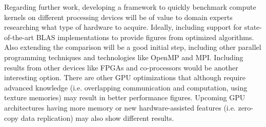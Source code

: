 \documentclass{llncs}
\begin{document}
\smallskip

Regarding further work, developing a framework to quickly benchmark compute kernels on different processing devices will be of value to domain experts researching what type of hardware to acquire. Ideally, including support for state-of-the-art BLAS implementations to provide figures from optimized algorithms. Also extending the comparison will be a good initial step, including other parallel programming techniques and technologies like OpenMP and MPI. Including results from other devices like FPGAs and co-processors would be another interesting option. There are other GPU optimizations that although require advanced knowledge (i.e. overlapping communication and computation, using texture memories) may result in better performance figures. Upcoming GPU architectures having more memory or new hardware-assisted features
(i.e. zero-copy data replication) may also show different results.




\end{document}
